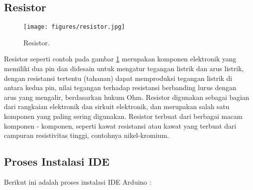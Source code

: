 \subsection{Resistor}
\begin{figure}[ht]
\centerline{\texttt{[image: figures/resistor.jpg]}}
\caption{Resistor.}
\label{resistor}
\end{figure}
Resistor seperti contoh pada gambar \ref{resistor} merupakan komponen elektronik yang memiliki dua pin dan didesain untuk mengatur tegangan listrik dan arus listrik, dengan resistansi tertentu (tahanan) dapat memproduksi tegangan listrik di antara kedua pin, nilai tegangan terhadap resistansi berbanding lurus dengan arus yang mengalir, berdasarkan hukum Ohm.
Resistor digunakan sebagai bagian dari rangkaian elektronik dan sirkuit elektronik, dan merupakan salah satu komponen yang paling sering digunakan. Resistor terbuat dari berbagai macam komponen - komponen, seperti kawat resistansi atau kawat yang terbuat dari campuran resistivitas tinggi, contohnya nikel-kromium.



\subsection{Proses Instalasi IDE}

Berikut ini adalah proses instalasi IDE Arduino :

